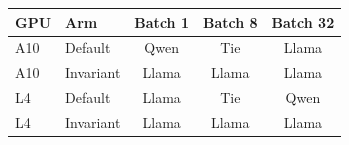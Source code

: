 \begin{tabular}{llccc}
\toprule
GPU & Arm & Batch 1 & Batch 8 & Batch 32 \\
\midrule
A10 & Default & Qwen & Tie & Llama \\
A10 & Invariant & Llama & Llama & Llama \\
L4 & Default & Llama & Tie & Qwen \\
L4 & Invariant & Llama & Llama & Llama \\
\bottomrule
\end{tabular}
